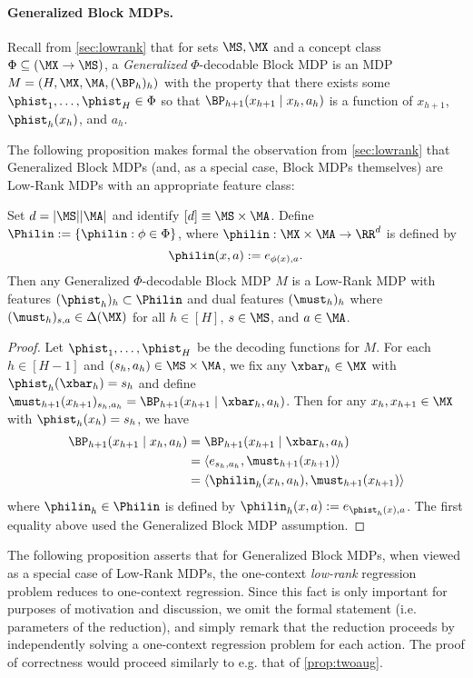 \paragraph{Generalized Block MDPs.} Recall from \cref{sec:lowrank} that  for sets $\MS,\MX$ and a concept class $\Phi \subseteq (\MX\to\MS)$, a \emph{Generalized} $\Phi$-decodable Block MDP is an MDP $M = (H, \MX,\MA,(\BP_h)_h)$ with the property that there exists some $\phist_1,\dots,\phist_H \in \Phi$ so that $\BP_{h+1}(x_{h+1}\mid{}x_h,a_h)$ is a function of $x_{h+1}$, $\phist_h(x_h)$, and $a_h$. 

The following proposition makes formal the observation from \cref{sec:lowrank} that Generalized Block MDPs (and, as a special case, Block MDPs themselves) are Low-Rank MDPs with an appropriate feature class:

\begin{proposition}\label{prop:genblock-is-lowrank}
Set $d = |\MS||\MA|$ and identify $[d] \equiv \MS\times\MA$. Define $\Philin := \{\philin: \phi \in \Phi\}$, where $\philin: \MX\times\MA \to \RR^d$ is defined by
\[\philin(x,a) := e_{\phi(x), a}.\]
Then any Generalized $\Phi$-decodable Block MDP $M$ is a Low-Rank MDP \citep{agarwal2020flambe,mhammedi2023efficient} with features $(\phist_h)_h \subset \Philin$ and dual features $(\must_h)_h$ where $(\must_h)_{s,a} \in \Delta(\MX)$ for all $h\in[H]$, $s\in\MS$, and $a\in\MA$.
\end{proposition}

\begin{proof}
Let $\phist_1,\dots,\phist_H$ be the decoding functions for $M$. For each $h \in [H-1]$ and $(s_h,a_h) \in \MS\times\MA$, we fix any $\xbar_h \in \MX$ with $\phist_h(\xbar_h)=s_h$ and define $\must_{h+1}(x_{h+1})_{s_h,a_h} = \BP_{h+1}(x_{h+1}\mid{}\xbar_h,a_h)$. Then for any $x_h,x_{h+1} \in \MX$ with $\phist_h(x_h) = s_h$, we have
\begin{align*}
\BP_{h+1}(x_{h+1}\mid{}x_h,a_h) 
&= \BP_{h+1}(x_{h+1}\mid{}\xbar_h,a_h) \\ 
&= \langle e_{s_h,a_h}, \must_{h+1}(x_{h+1})\rangle \\ 
&= \langle \philin_h(x_h,a_h), \must_{h+1}(x_{h+1})\rangle
\end{align*}
where $\philin_h\in\Philin$ is defined by $\philin_h(x,a) := e_{\phist_h(x),a}$. The first equality above used the Generalized Block MDP assumption.
\end{proof}

The following proposition asserts that for Generalized Block MDPs, when viewed as a special case of Low-Rank MDPs, the one-context \emph{low-rank} regression problem reduces to one-context regression. Since this fact is only important for purposes of motivation and discussion, we omit the formal statement (i.e. parameters of the reduction), and simply remark that the reduction proceeds by independently solving a one-context regression problem for each action. The proof of correctness would proceed similarly to e.g. that of \cref{prop:twoaug}.

